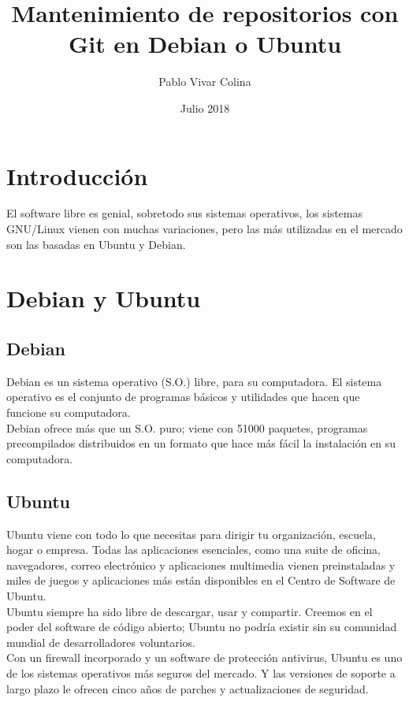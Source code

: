 \documentclass[]{article}
\title{Mantenimiento de repositorios con Git en Debian o Ubuntu}
\author{Pablo Vivar Colina}
\date{Julio 2018}
\begin{document}
\maketitle

\section{Introducción}

El software libre es genial, sobretodo sus sistemas operativos, los sistemas GNU/Linux vienen con muchas variaciones, pero las más utilizadas en el mercado son las basadas en Ubuntu y Debian.\\

\section{Debian y Ubuntu}

\subsection{Debian}

Debian es un sistema operativo (S.O.) libre, para su computadora. El sistema operativo es el conjunto de programas básicos y utilidades que hacen que funcione su computadora.\\

Debian ofrece más que un S.O. puro; viene con 51000 paquetes, programas precompilados distribuidos en un formato que hace más fácil la instalación en su computadora.\\

\subsection{Ubuntu}

Ubuntu viene con todo lo que necesitas para dirigir tu organización, escuela, hogar o empresa. Todas las aplicaciones esenciales, como una suite de oficina, navegadores, correo electrónico y aplicaciones multimedia vienen preinstaladas y miles de juegos y aplicaciones más están disponibles en el Centro de Software de Ubuntu.\\

Ubuntu siempre ha sido libre de descargar, usar y compartir. Creemos en el poder del software de código abierto; Ubuntu no podría existir sin su comunidad mundial de desarrolladores voluntarios.\\

Con un firewall incorporado y un software de protección antivirus, Ubuntu es uno de los sistemas operativos más seguros del mercado. Y las versiones de soporte a largo plazo le ofrecen cinco años de parches y actualizaciones de seguridad.\\
\end{document}
